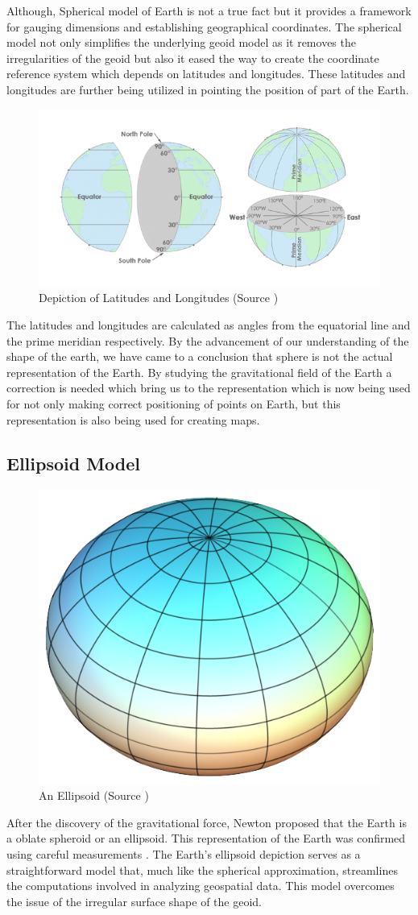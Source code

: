 Although, Spherical model of Earth is not a true fact but it provides a framework for gauging dimensions and establishing geographical coordinates.
The spherical model not only simplifies the underlying geoid model as it removes the irregularities of the geoid but also it eased the way to create the coordinate reference
system which depends on latitudes and longitudes.
These latitudes and longitudes are further being utilized in pointing the position of part of the Earth.
\begin{figure}[h]
    \centering
    \includegraphics[width=0.7\linewidth]{figures/chapter-2/lat_lon.png}
    \caption{Depiction of Latitudes and Longitudes (Source \cite{GISGEO_LatLon}) }
    \label{fig:shpere-image}
\end{figure}

The latitudes and longitudes are calculated as angles from the equatorial line and the prime meridian respectively. By the advancement of our understanding of the shape of the earth, we have came to a conclusion that sphere is not the actual representation of the Earth. By studying the gravitational field of the Earth a
correction is needed which bring us to the representation which is now being used for not only making correct positioning of points on Earth, but this representation is also being used for creating maps.

\subsection{Ellipsoid Model}

\begin{figure}[h]
    \centering
    \includegraphics[width=0.4\linewidth]{figures/chapter-2/elipsoid.png}
    \caption{An Ellipsoid (Source \cite{GISGEO_Ellipsoid}) }
    \label{fig:ellipsoid-image}
\end{figure}
After the discovery of the gravitational force, Newton proposed that the Earth is a oblate spheroid or an ellipsoid. This representation of the Earth was confirmed using careful measurements \cite{Osserman2006-ys}. The Earth's ellipsoid depiction serves as a straightforward model that, much like the spherical approximation, streamlines the computations involved in analyzing geospatial data.
This model overcomes the issue of the irregular surface shape of the geoid.


